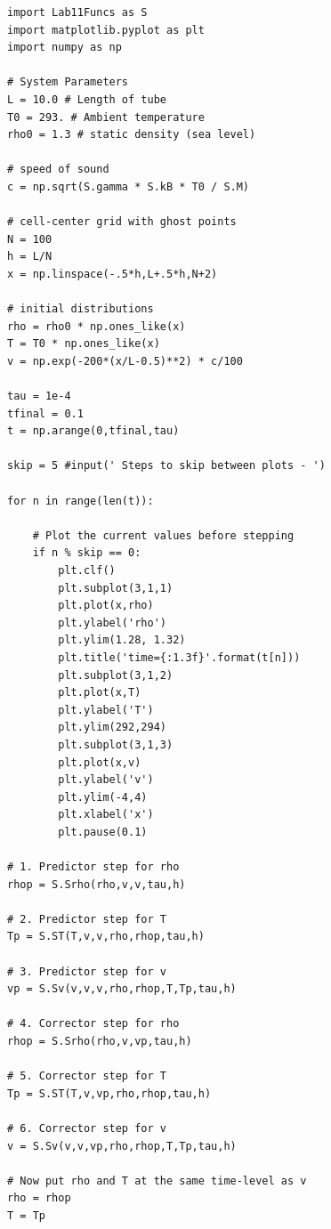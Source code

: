 \documentclass{book}
\theoremstyle{plain}
\theoremstyle{definition}
\numberwithin{exm}{chapter}
\theoremstyle{remark}
\theoremstyle{summary}
\theoremstyle{overview}
\begin{document}
\begin{lstlisting}
import Lab11Funcs as S
import matplotlib.pyplot as plt
import numpy as np

# System Parameters
L = 10.0 # Length of tube
T0 = 293. # Ambient temperature
rho0 = 1.3 # static density (sea level)

# speed of sound
c = np.sqrt(S.gamma * S.kB * T0 / S.M)

# cell-center grid with ghost points
N = 100
h = L/N
x = np.linspace(-.5*h,L+.5*h,N+2)

# initial distributions
rho = rho0 * np.ones_like(x)
T = T0 * np.ones_like(x)
v = np.exp(-200*(x/L-0.5)**2) * c/100

tau = 1e-4
tfinal = 0.1
t = np.arange(0,tfinal,tau)

skip = 5 #input(' Steps to skip between plots - ')

for n in range(len(t)):

	# Plot the current values before stepping
	if n % skip == 0:
		plt.clf()
		plt.subplot(3,1,1)
		plt.plot(x,rho)
		plt.ylabel('rho')
		plt.ylim(1.28, 1.32)
		plt.title('time={:1.3f}'.format(t[n]))
		plt.subplot(3,1,2)
		plt.plot(x,T)
		plt.ylabel('T')
		plt.ylim(292,294)
		plt.subplot(3,1,3)
		plt.plot(x,v)
		plt.ylabel('v')
		plt.ylim(-4,4)
		plt.xlabel('x')
		plt.pause(0.1)
		
# 1. Predictor step for rho
rhop = S.Srho(rho,v,v,tau,h)

# 2. Predictor step for T
Tp = S.ST(T,v,v,rho,rhop,tau,h)

# 3. Predictor step for v
vp = S.Sv(v,v,v,rho,rhop,T,Tp,tau,h)

# 4. Corrector step for rho
rhop = S.Srho(rho,v,vp,tau,h)

# 5. Corrector step for T
Tp = S.ST(T,v,vp,rho,rhop,tau,h)

# 6. Corrector step for v
v = S.Sv(v,v,vp,rho,rhop,T,Tp,tau,h)

# Now put rho and T at the same time-level as v
rho = rhop
T = Tp
\end{lstlisting}
\end{document}
